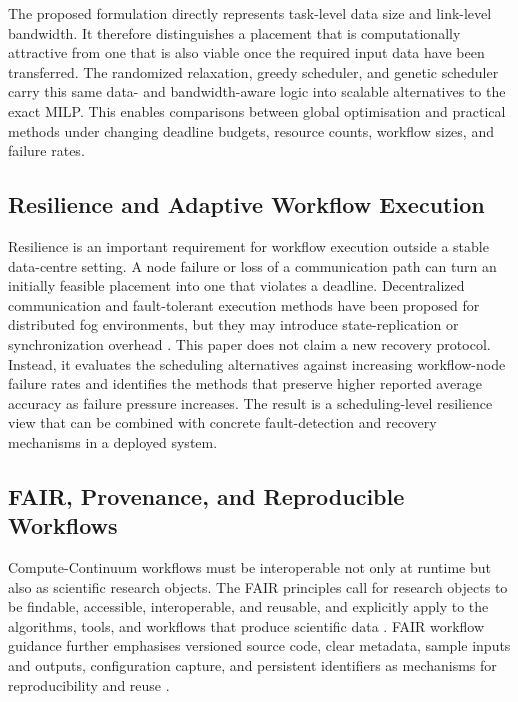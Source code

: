 The proposed formulation directly represents task-level data size and link-level bandwidth. It therefore distinguishes a placement that is computationally attractive from one that is also viable once the required input data have been transferred. The randomized relaxation, greedy scheduler, and genetic scheduler carry this same data- and bandwidth-aware logic into scalable alternatives to the exact MILP. This enables comparisons between global optimisation and practical methods under changing deadline budgets, resource counts, workflow sizes, and failure rates.

\subsection{Resilience and Adaptive Workflow Execution}

Resilience is an important requirement for workflow execution outside a stable data-centre setting. A node failure or loss of a communication path can turn an initially feasible placement into one that violates a deadline. Decentralized communication and fault-tolerant execution methods have been proposed for distributed fog environments, but they may introduce state-replication or synchronization overhead \cite{xie2023decentralized,zhang2022faulttolerant,wang2023latencyaware}. This paper does not claim a new recovery protocol. Instead, it evaluates the scheduling alternatives against increasing workflow-node failure rates and identifies the methods that preserve higher reported average accuracy as failure pressure increases. The result is a scheduling-level resilience view that can be combined with concrete fault-detection and recovery mechanisms in a deployed system.

\subsection{FAIR, Provenance, and Reproducible Workflows}

Compute-Continuum workflows must be interoperable not only at runtime but also as scientific research objects. The FAIR principles call for research objects to be findable, accessible, interoperable, and reusable, and explicitly apply to the algorithms, tools, and workflows that produce scientific data \cite{wilkinson2016fair}. FAIR workflow guidance further emphasises versioned source code, clear metadata, sample inputs and outputs, configuration capture, and persistent identifiers as mechanisms for reproducibility and reuse \cite{devisser2023fairworkflows}.

